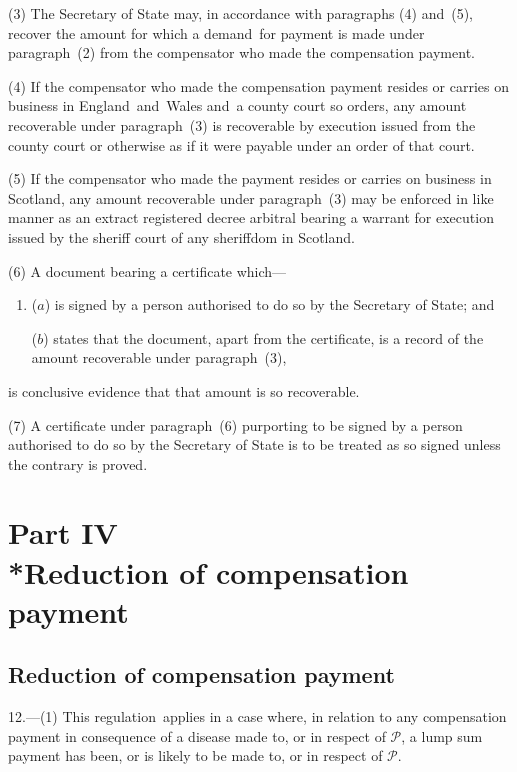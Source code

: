 \documentclass[12pt,a4paper]{article}
\begin{document}
(3) The Secretary of State may, in accordance with paragraphs (4) and~(5), recover the amount for which a demand~for payment is made under paragraph~(2) from the compensator who made the compensation payment.

(4) If the compensator who made the compensation payment resides or carries on business in England~and~Wales and~a county court so orders, any amount recoverable under paragraph~(3) is recoverable by execution issued from the county court or otherwise as if it were payable under an order of that court.

(5) If the compensator who made the payment resides or carries on business in Scotland, any amount recoverable under paragraph~(3) may be enforced in like manner as an extract registered decree arbitral bearing a warrant for execution issued by the sheriff court of any sheriffdom in Scotland.

(6) A document bearing a certificate which—
\begin{enumerate}\item[]
($a$) is signed by a person authorised to do so by the Secretary of State; and

($b$) states that the document, apart from the certificate, is a record of the amount recoverable under paragraph~(3),
\end{enumerate}
is conclusive evidence that that amount is so recoverable.

(7) A certificate under paragraph~(6) purporting to be signed by a person authorised to do so by the Secretary of State is to be treated as so signed unless the contrary is proved.

\section[Part IV --- Reduction of compensation payment]{Part IV\\*Reduction of compensation payment}

\renewcommand\parthead{--- Part IV}

\subsection[12. Reduction of compensation payment]{Reduction of compensation payment}

12.---(1)  This regulation~applies in a case where, in relation to any compensation payment in consequence of a disease made to, or in respect of $\mathcal{P}$, a lump sum payment has been, or is likely to be made to, or in respect of $\mathcal{P}$.
\end{document}

